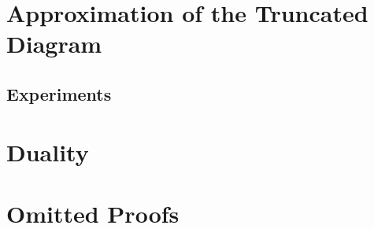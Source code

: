 \documentclass[12pt]{article}
\begin{document}
\clearpage
\section{Approximation of the Truncated Diagram}
  

  \subsection{Experiments}
    





\clearpage
\appendix
% 

\section{Duality}\label{apx:duality}


\section{Omitted Proofs}\label{apx:omit}
\printproofs

% 
%
% 

\end{document}
